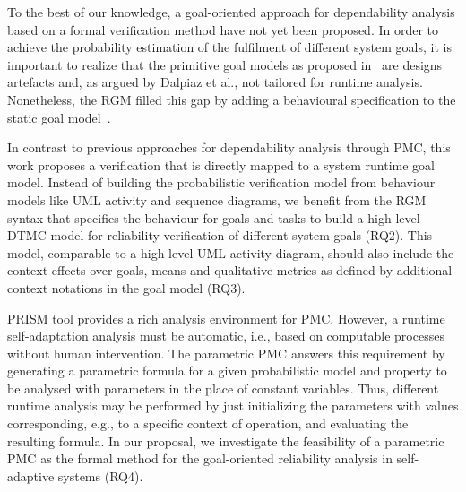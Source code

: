 %




To the best of our knowledge, a goal-oriented approach for dependability analysis based on a formal verification method have not yet been proposed. In order to achieve the probability estimation of the fulfilment of different system goals, it is important to realize that the primitive goal models as proposed in~\cite{Dardenne1993, Yu1996, Bresciani:2004} are designs artefacts and, as argued by Dalpiaz et al., not tailored for runtime analysis. Nonetheless, the RGM filled this gap by adding a behavioural specification to the static goal model~\cite{Dalpiaz:2013}.

In contrast to previous approaches for dependability analysis through PMC, this work proposes a verification that is directly mapped to a system runtime goal model. Instead of building the probabilistic verification model from behaviour models like UML activity and sequence diagrams, we benefit from the RGM syntax that specifies the behaviour for goals and tasks to build a high-level DTMC model for reliability verification of different system goals (RQ2). This model, comparable to a high-level UML activity diagram, should also include the context effects over goals, means and qualitative metrics as defined by additional context notations in the goal model (RQ3).

PRISM tool provides a rich analysis environment for PMC. However, a runtime self-adaptation analysis must be automatic, i.e., based on computable processes without human intervention. The parametric PMC answers this requirement by generating a parametric formula for a given probabilistic model and property to be analysed with parameters in the place of constant variables. Thus, different runtime analysis may be performed by just initializing the parameters with values corresponding, e.g., to a specific context of operation, and evaluating the resulting formula. In our proposal, we investigate the feasibility of a parametric PMC as the formal method for the goal-oriented reliability analysis in self-adaptive systems (RQ4).

